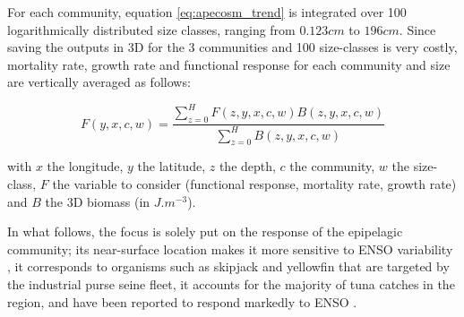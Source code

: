 For each community, equation \ref{eq:apecosm_trend} is integrated over 100 logarithmically distributed size classes, ranging from $0.123cm$ to $196cm$. Since saving the outputs in 3D for the 3 communities and 100 size-classes is very costly, mortality rate, growth rate and functional response for each community and size are vertically averaged as follows:

\begin{equation}
F(y,x,c,w) = \frac{\sum_{z=0}^{H} F(z, y, x, c, w) B(z, y, x, c, w)}{\sum_{z=0}^{H}B(z, y, x, c, w	)}
\end{equation}

with $x$ the longitude, $y$ the latitude, $z$ the depth, $c$ the community, $w$ the size-class, $F$ the variable to consider (functional response, mortality rate, growth rate) and $B$ the 3D biomass (in $J.m^{-3}$).

In what follows, the focus is solely put on the response of the epipelagic community; its near-surface location makes it more sensitive to ENSO variability \citep{lemezoNaturalVariabilityMarine2016}, it corresponds to organisms such as skipjack and yellowfin that are targeted by the industrial purse seine fleet, it accounts for the majority of tuna catches in the region, and have been reported to respond markedly to ENSO \citep{lehodeyNinoSouthernOscillation1997}.
